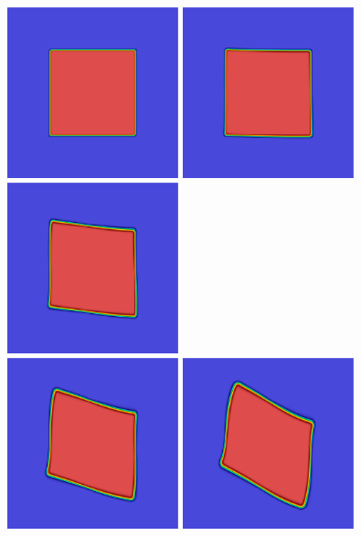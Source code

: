 \documentclass[final]{siamltex}
\begin{document}
\begin{figure}
\begin{center}
\includegraphics[width=1.95in]{square_1}
\includegraphics[width=1.95in]{square_2}
\includegraphics[width=1.95in]{square_3}\\
\includegraphics[width=1.95in]{square_4}
\includegraphics[width=1.95in]{square_5}

\end{center}
\end{figure}
\end{document}
